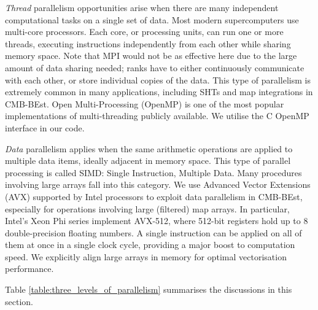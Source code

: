 \textit{Thread} parallelism opportunities arise when there are many independent computational tasks on a single set of data. Most modern supercomputers use multi-core processors. Each core, or processing units, can run one or more threads, executing instructions independently from each other while sharing memory space. Note that MPI would not be as effective here due to the large amount of data sharing needed; ranks have to either continuously communicate with each other, or store individual copies of the data. This type of parallelism is extremely common in many applications, including SHTs and map integrations in CMB-BEst. Open Multi-Processing (OpenMP) is one of the most popular implementations of multi-threading publicly available. We utilise the \textsc{C} OpenMP interface in our code. 

\textit{Data} parallelism applies when the same arithmetic operations are applied to multiple data items, ideally adjacent in memory space. This type of parallel processing is called SIMD: Single Instruction, Multiple Data. Many procedures involving large arrays fall into this category. We use Advanced Vector Extensions (AVX) supported by Intel processors to exploit data parallelism in CMB-BEst, especially for operations involving large (filtered) map arrays. In particular, Intel's Xeon Phi series implement AVX-512, where 512-bit registers hold up to 8 double-precision floating numbers. A single instruction can be applied on all of them at once in a single clock cycle, providing a major boost to computation speed. We explicitly align large arrays in memory for optimal vectorisation performance.

Table \ref{table:three_levels_of_parallelism} summarises the discussions in this section.

